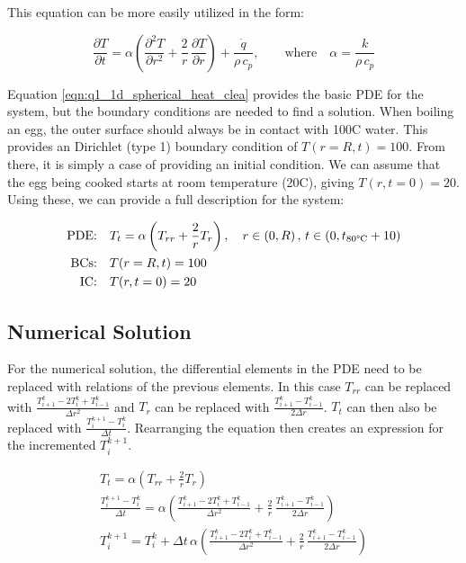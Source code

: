 \documentclass[12pt]{article}
\begin{document}
\noindent This equation can be more easily utilized in the form:

\begin{equation}
    \label{eqn:q1_1d_spherical_heat_clean}
    \frac{\partial T}{\partial t} = \alpha \left( \frac{\partial^2 T}{\partial r^2} + \frac{2}{r} \, \frac{\partial T}{\partial r} \right) + \frac{\dot q}{\rho \, c_p} , \qquad \text{where} \quad \alpha = \frac{k}{\rho \, c_p}
\end{equation}

Equation \ref{eqn:q1_1d_spherical_heat_clea} provides the basic PDE for the system, but the boundary conditions are needed to find a solution. When boiling an egg, the outer surface should always be in contact with 100\textdegree C water. This provides an Dirichlet (type 1) boundary condition of $T(r=R, t) = 100$. From there, it is simply a case of providing an initial condition. We can assume that the egg being cooked starts at room temperature (20\textdegree C), giving $T(r, t=0) = 20$. Using these, we can provide a full description for the system:

\begin{equation}
    \label{eqn:q1_pde}
    \begin{aligned}
        \text{PDE:} & \quad T_t = \alpha \left( T_{rr} + \frac{2}{r} T_r \right), \quad r \in \left(0, R\right), \, t \in \left(0, t_{\text{80\textdegree C}} + 10 \right) \\
        \text{BCs:} & \quad T(r=R, t) = 100 \\
        \text{IC:}  & \quad T(r, t=0) = 20 \\
    \end{aligned}
\end{equation}

\subsection{Numerical Solution}

For the numerical solution, the differential elements in the PDE need to be replaced with relations of the previous elements. In this case $T_{rr}$ can be replaced with $\frac{T_{i+1}^k - 2 T_i^k + T_{i-1}^k}{\Delta r^2}$ and $T_r$ can be replaced with $\frac{T_{i+1}^k - T_{i-1}^k}{2 \Delta r}$. $T_t$ can then also be replaced with $\frac{T_i^{k+1} - T_i^k}{\Delta t}$. Rearranging the equation then creates an expression for the incremented $T_i^{k+1}$.

\begin{equation}
    \label{eqn:q1_numerical_soln}
    \begin{gathered}
        T_t = \alpha \left( T_{rr} + \frac{2}{r} T_r \right) \\
        \frac{T_i^{k+1} - T_i^k}{\Delta t} = \alpha \left( \frac{T_{i+1}^k - 2 T_i^k + T_{i-1}^k}{\Delta r^2} + \frac{2}{r} \, \frac{T_{i+1}^k - T_{i-1}^k}{2\Delta r} \right) \\
        T_i^{k+1} = T_i^k + \Delta t \, \alpha \left( \frac{T_{i+1}^k - 2 T_i^k + T_{i-1}^k}{\Delta r^2} + \frac{2}{r} \, \frac{T_{i+1}^k - T_{i-1}^k}{2\Delta r} \right)
    \end{gathered}
\end{equation}
\end{document}
